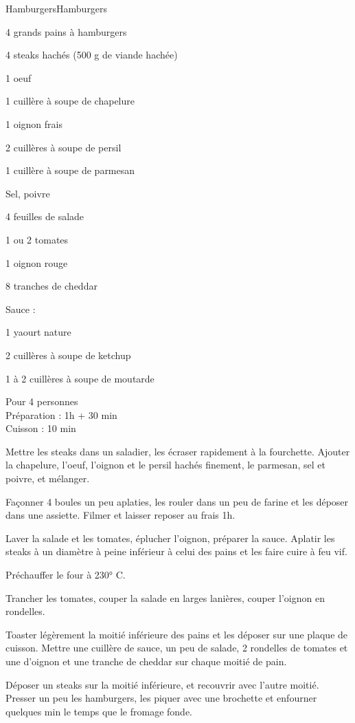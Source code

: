 \begin{recette}{Hamburgers}{Hamburgers}

\begin{ingredients}
4 grands pains à hamburgers\par
4 steaks hachés (500 g de viande hachée)\par
1 oeuf\par
1 cuillère à soupe de chapelure\par
1 oignon frais\par
2 cuillères à soupe de persil\par
1 cuillère à soupe de parmesan\par
Sel, poivre\par
4 feuilles de salade\par
1 ou 2 tomates\par
1 oignon rouge\par
8 tranches de cheddar\par
Sauce :\par
1 yaourt nature\par
2 cuillères à soupe de ketchup\par
1 à 2 cuillères à soupe de moutarde\par
\end{ingredients}

\begin{infos}
Pour 4 personnes\\
Préparation : 1h + 30 min\\
Cuisson : 10 min\\
\end{infos}

\begin{etapes}
\item Mettre les steaks dans un saladier, les écraser rapidement à la fourchette. Ajouter la chapelure, l'oeuf, l'oignon et le persil hachés finement, le parmesan, sel et poivre, et mélanger.
\item Façonner 4 boules un peu aplaties, les rouler dans un peu de farine et les déposer dans une assiette. Filmer et laisser reposer au frais 1h.
\item Laver la salade et les tomates, éplucher l'oignon, préparer la sauce. Aplatir les steaks à un diamètre à peine inférieur à celui des pains et les faire cuire à feu vif.
\item Préchauffer le four à 230° C.
\item Trancher les tomates, couper la salade en larges lanières, couper l'oignon en rondelles.
\item Toaster légèrement la moitié inférieure des pains et les déposer sur une plaque de cuisson. Mettre une cuillère de sauce, un peu de salade, 2 rondelles de tomates et une d'oignon et une tranche de cheddar sur chaque moitié de pain.
\item Déposer un steaks sur la moitié inférieure, et recouvrir avec l'autre moitié. Presser un peu les hamburgers, les piquer avec une brochette et enfourner quelques min le temps que le fromage fonde.
\end{etapes}


\end{recette}

